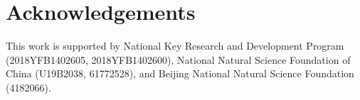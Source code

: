 \section*{Acknowledgements}
This work is supported by National Key Research and Development Program (2018YFB1402605, 2018YFB1402600), National Natural Science Foundation of China (U19B2038, 61772528), and Beijing National Natural Science Foundation (4182066).
